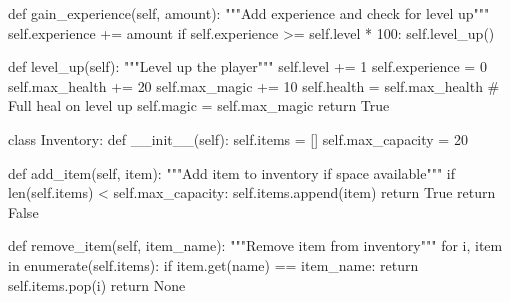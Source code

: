 \documentclass[
  letterpaper,
  DIV=11,
  numbers=noendperiod,
  oneside]{scrreprt}
\newenvironment{Shaded}{}{}
\newcommand{\BuiltInTok}[1]{\textcolor[rgb]{0.84,0.23,0.29}{#1}}
\newcommand{\CommentTok}[1]{\textcolor[rgb]{0.42,0.45,0.49}{#1}}
\newcommand{\ControlFlowTok}[1]{\textcolor[rgb]{0.84,0.23,0.29}{#1}}
\newcommand{\DecValTok}[1]{\textcolor[rgb]{0.00,0.36,0.77}{#1}}
\newcommand{\FunctionTok}[1]{\textcolor[rgb]{0.44,0.26,0.76}{#1}}
\newcommand{\KeywordTok}[1]{\textcolor[rgb]{0.84,0.23,0.29}{#1}}
\newcommand{\NormalTok}[1]{\textcolor[rgb]{0.14,0.16,0.18}{#1}}
\newcommand{\OperatorTok}[1]{\textcolor[rgb]{0.14,0.16,0.18}{#1}}
\newcommand{\StringTok}[1]{\textcolor[rgb]{0.01,0.18,0.38}{#1}}
\newcommand{\VariableTok}[1]{\textcolor[rgb]{0.89,0.38,0.04}{#1}}
\begin{document}
\begin{Shaded}
\begin{Highlighting}[]
    \KeywordTok{def}\NormalTok{ gain\_experience(}\VariableTok{self}\NormalTok{, amount):}
        \CommentTok{"""Add experience and check for level up"""}
        \VariableTok{self}\NormalTok{.experience }\OperatorTok{+=}\NormalTok{ amount}
        \ControlFlowTok{if} \VariableTok{self}\NormalTok{.experience }\OperatorTok{\textgreater{}=} \VariableTok{self}\NormalTok{.level }\OperatorTok{*} \DecValTok{100}\NormalTok{:}
            \VariableTok{self}\NormalTok{.level\_up()}
    
    \KeywordTok{def}\NormalTok{ level\_up(}\VariableTok{self}\NormalTok{):}
        \CommentTok{"""Level up the player"""}
        \VariableTok{self}\NormalTok{.level }\OperatorTok{+=} \DecValTok{1}
        \VariableTok{self}\NormalTok{.experience }\OperatorTok{=} \DecValTok{0}
        \VariableTok{self}\NormalTok{.max\_health }\OperatorTok{+=} \DecValTok{20}
        \VariableTok{self}\NormalTok{.max\_magic }\OperatorTok{+=} \DecValTok{10}
        \VariableTok{self}\NormalTok{.health }\OperatorTok{=} \VariableTok{self}\NormalTok{.max\_health  }\CommentTok{\# Full heal on level up}
        \VariableTok{self}\NormalTok{.magic }\OperatorTok{=} \VariableTok{self}\NormalTok{.max\_magic}
        \ControlFlowTok{return} \VariableTok{True}

\KeywordTok{class}\NormalTok{ Inventory:}
    \KeywordTok{def} \FunctionTok{\_\_init\_\_}\NormalTok{(}\VariableTok{self}\NormalTok{):}
        \VariableTok{self}\NormalTok{.items }\OperatorTok{=}\NormalTok{ []}
        \VariableTok{self}\NormalTok{.max\_capacity }\OperatorTok{=} \DecValTok{20}
    
    \KeywordTok{def}\NormalTok{ add\_item(}\VariableTok{self}\NormalTok{, item):}
        \CommentTok{"""Add item to inventory if space available"""}
        \ControlFlowTok{if} \BuiltInTok{len}\NormalTok{(}\VariableTok{self}\NormalTok{.items) }\OperatorTok{\textless{}} \VariableTok{self}\NormalTok{.max\_capacity:}
            \VariableTok{self}\NormalTok{.items.append(item)}
            \ControlFlowTok{return} \VariableTok{True}
        \ControlFlowTok{return} \VariableTok{False}
    
    \KeywordTok{def}\NormalTok{ remove\_item(}\VariableTok{self}\NormalTok{, item\_name):}
        \CommentTok{"""Remove item from inventory"""}
        \ControlFlowTok{for}\NormalTok{ i, item }\KeywordTok{in} \BuiltInTok{enumerate}\NormalTok{(}\VariableTok{self}\NormalTok{.items):}
            \ControlFlowTok{if}\NormalTok{ item.get(}\StringTok{\textquotesingle{}name\textquotesingle{}}\NormalTok{) }\OperatorTok{==}\NormalTok{ item\_name:}
                \ControlFlowTok{return} \VariableTok{self}\NormalTok{.items.pop(i)}
        \ControlFlowTok{return} \VariableTok{None}
    

\end{Highlighting}
\end{Shaded}
\end{document}
